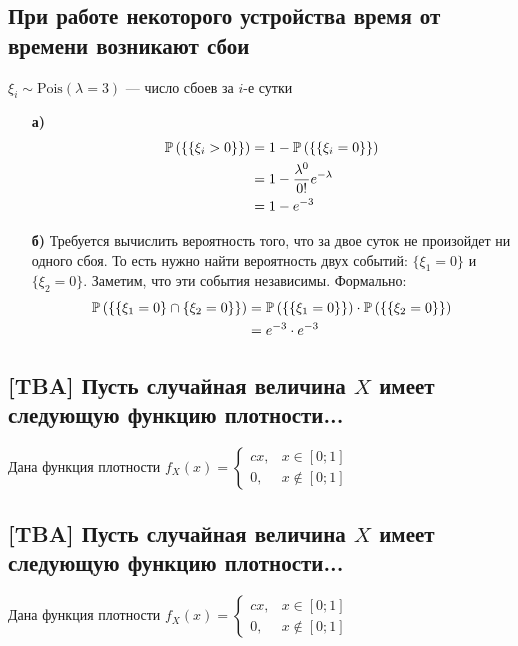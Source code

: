 \documentclass{article}
\begin{document}
\subsection{При работе некоторого устройства время от времени возникают сбои}
$\xi_i\sim\text{Pois}(\lambda=3)$ — число сбоев за $i$-е сутки
\begin{enumerate}
    \item[\textbf{а)}] \begin{equation*}
        \begin{aligned}
            \mathbb{P}\left(\{\{\xi_i>0\}\}\right)&=1-\mathbb{P}\left(\{\{\xi_i=0\}\}\right)\\
            &=1-\frac{\lambda^0}{0!}e^{-\lambda}\\
            &=1-e^{-3}
        \end{aligned}
    \end{equation*}
    \item[\textbf{б)}] Требуется вычислить вероятность того, что за двое суток не произойдет ни одного сбоя. То есть нужно найти вероятность двух событий: $\{\xi_1=0\}$ и $\{\xi_2=0\}$. Заметим, что эти события независимы. Формально:
    \begin{equation*}
        \begin{aligned}
            \mathbb{P}\left(\{\{\xi_1=0\}\cap\{\xi_2=0\}\}\right)&=\mathbb{P}\left(\{\{\xi_1=0\}\}\right)\cdot\mathbb{P}\left(\{\{\xi_2=0\}\}\right)\\
            &=e^{-3}\cdot e^{-3}
        \end{aligned}
    \end{equation*}
\end{enumerate}


\subsection{[TBA] Пусть случайная величина $X$ имеет следующую функцию плотности...}
Дана функция плотности $f_{X}(x)=\begin{cases}
    cx,&x\in[0;1]\\
    0,&x\not\in[0;1]
\end{cases}$

\subsection{[TBA] Пусть случайная величина $X$ имеет следующую функцию плотности...}
Дана функция плотности $f_{X}(x)=\begin{cases}
    cx,&x\in[0;1]\\
    0,&x\not\in[0;1]
\end{cases}$
\end{document}
